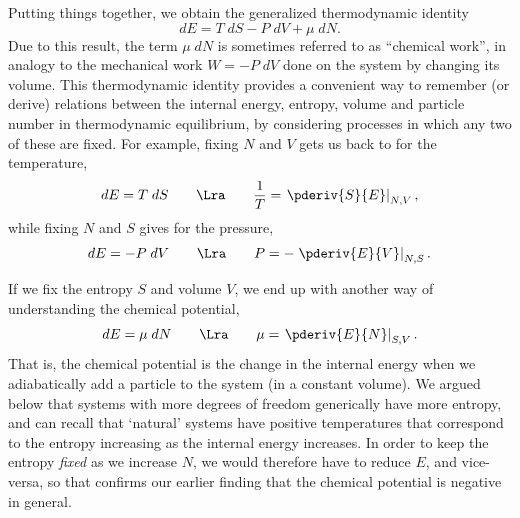Putting things together, we obtain the generalized thermodynamic identity
\begin{equation}
  \label{eq:thermo_ident}
  dE = T \; dS - P \; dV + \mu \; dN.
\end{equation}
Due to this result, the term $\mu \; dN$ is sometimes referred to as ``chemical work'', in analogy to the mechanical work $W = - P \; dV$ done on the system by changing its volume.
This thermodynamic identity provides a convenient way to remember (or derive) relations between the internal energy, entropy, volume and particle number in thermodynamic equilibrium, by considering processes in which any two of these are fixed.
For example, fixing $N$ and $V$ gets us back to  for the temperature,
\begin{equation*}
  dE = T \; dS \qquad \Lra \qquad \frac{1}{T} = \left.\pderiv{S}{E}\right|_{N, V},
\end{equation*}
while fixing $N$ and $S$ gives  for the pressure,
\begin{equation*}
  dE = -P \; dV \qquad \Lra \qquad P = -\left.\pderiv{E}{V}\right|_{N, S}.
\end{equation*}

If we fix the entropy $S$ and volume $V$, we end up with another way of understanding the chemical potential,
\begin{equation}
  \label{eq:mu_E}
  dE = \mu \; dN \qquad \Lra \qquad \mu = \left.\pderiv{E}{N}\right|_{S, V}.
\end{equation}
That is, the chemical potential is the change in the internal energy when we adiabatically add a particle to the system (in a constant volume).
We argued below  that systems with more degrees of freedom generically have more entropy, and can recall that `natural' systems have positive temperatures that correspond to the entropy increasing as the internal energy increases.
In order to keep the entropy \textit{fixed} as we increase $N$, we would therefore have to reduce $E$, and vice-versa, so that  confirms our earlier finding that the chemical potential is negative in general.
